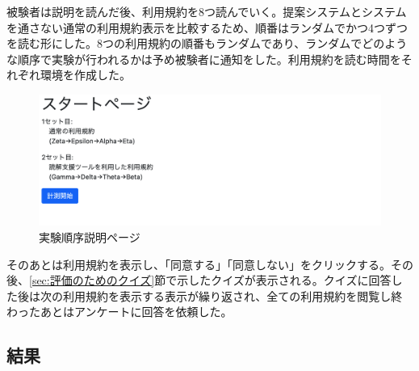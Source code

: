 被験者は説明を読んだ後、利用規約を8つ読んでいく。提案システムとシステムを通さない通常の利用規約表示を比較するため、順番はランダムでかつ4つずつを読む形にした。8つの利用規約の順番もランダムであり、ランダムでどのような順序で実験が行われるかは予め被験者に通知をした。利用規約を読む時間をそれぞれ環境を作成した。
\begin{figure}[h]
  \begin{center}
      \includegraphics[width=16cm]{img/teststart2.png}
      \caption{実験順序説明ページ}
      \label{img:実験順序説明ページ}
  \end{center}
\end{figure}

そのあとは利用規約を表示し、「同意する」「同意しない」をクリックする。その後、\ref{sec:評価のためのクイズ}節で示したクイズが表示される。クイズに回答した後は次の利用規約を表示する表示が繰り返され、全ての利用規約を閲覧し終わったあとはアンケートに回答を依頼した。

\subsection{結果}


